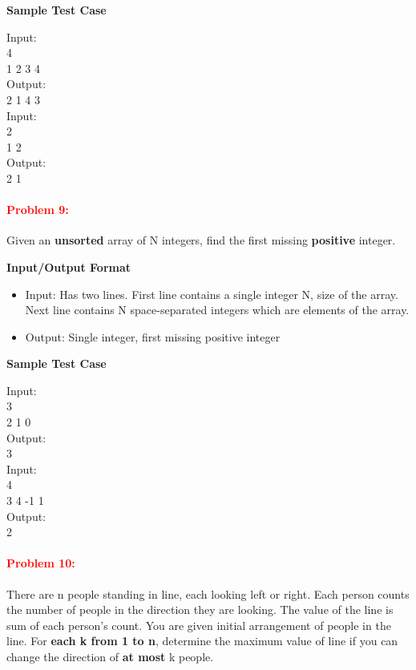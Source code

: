 \documentclass[a4paper,11pt]{article} %
\begin{document}
\textbf{Sample Test Case}

Input:\\
4\\
1 2 3 4 \\
Output:\\
2 1 4 3\\

Input:\\
2\\
1 2\\
Output:\\
2 1
\vspace*{0.3cm}

\paragraph{\textcolor{red}{Problem 9: }}
Given an \textbf{unsorted} array of N integers, find the first missing \textbf{positive} integer.

\textbf{Input/Output Format}
\begin{itemize}
    \item  Input: Has two lines. First line contains a single integer N, size of the array. Next line contains N space-separated integers which are elements of the array.
    \item  Output: Single integer, first missing positive integer
\end{itemize}

\textbf{Sample Test Case}

Input: \\
3\\
2 1 0\\
Output: \\
3\\

Input: \\
4\\
3 4 -1 1\\
Output: \\
2


\vspace*{0.3cm}

\paragraph{\textcolor{red}{Problem 10: }}
There are n people standing in line, each looking left or right. Each person counts the number of people in the direction they are looking. The value of the line is sum of each person's count. You are given initial arrangement of people in the line. For \textbf{each k from 1 to n}, determine the maximum value of line if you can change the direction of \textbf{at most} k people.
\end{document}
